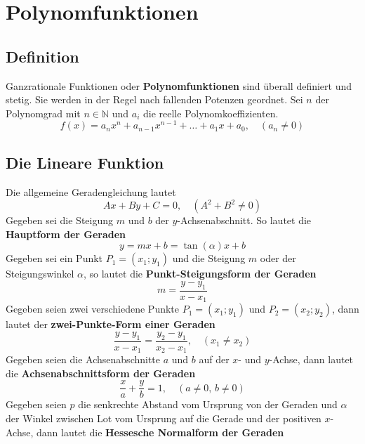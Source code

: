 \section{Polynomfunktionen}
\subsection{Definition}
Ganzrationale Funktionen oder \textbf{Polynomfunktionen} sind überall definiert und stetig. Sie werden in der Regel nach fallenden Potenzen geordnet. Sei $n$ der Polynomgrad mit $n\in \mathbb{N}$ und $a_i$ die reelle Polynomkoeffizienten.
\begin{equation}
\boxed{f\left(x\right)=a_nx^n+a_{n-1}x^{n-1}+\dotso + a_1x+a_0,\quad \left(a_n\neq 0\right)}
\end{equation}
\subsection{Die Lineare Funktion}
Die allgemeine Geradengleichung lautet
\begin{equation}
\boxed{Ax+By+C=0,\quad \left(A^2+B^2\neq 0\right)}
\end{equation}
Gegeben sei die Steigung $m$ und $b$ der $y$-Achsenabschnitt. So lautet die \textbf{Hauptform der Geraden}
\begin{equation}
\boxed{y=mx+b=\tan\left(\alpha\right)x+b}
\end{equation}
Gegeben sei ein Punkt $P_1=\left(x_1;y_1\right)$ und die Steigung $m$ oder der Steigungswinkel $\alpha$, so lautet die \textbf{Punkt-Steigungsform der Geraden}
\begin{equation}
\boxed{m=\dfrac{y-y_1}{x-x_1}}
\end{equation}
Gegeben seien zwei verschiedene Punkte $P_1=\left(x_1; y_1\right)$ und $P_2=\left(x_2; y_2\right)$, dann lautet der \textbf{zwei-Punkte-Form einer Geraden}
\begin{equation}
\boxed{\dfrac{y-y_1}{x-x_1}=\dfrac{y_2-y_1}{x_2-x_1},\quad \left(x_1\neq x_2\right)}
\end{equation}
Gegeben seien die Achsenabschnitte $a$ und $b$ auf der $x$- und $y$-Achse, dann lautet die \textbf{Achsenabschnittsform der Geraden}
\begin{equation} 
\boxed{\dfrac{x}{a}+\dfrac{y}{b}=1,\quad \left(a\neq 0, \,b\neq 0\right)}
\end{equation} 
Gegeben seien $p$ die senkrechte Abstand vom Ursprung von der Geraden und $\alpha$ der Winkel zwischen Lot vom Ursprung auf die Gerade und der positiven $x$-Achse, dann lautet die \textbf{Hessesche Normalform der Geraden}
